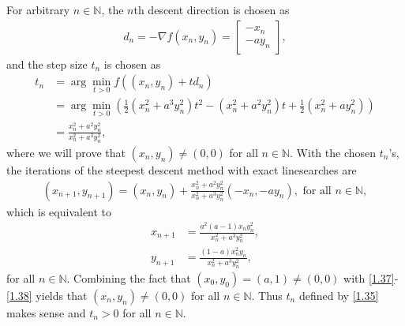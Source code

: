 \documentclass[a4paper]{article}
\numberwithin{equation}{section}
\begin{document}
For arbitrary $n\in \mathbb{N}$, the $n$th descent direction is chosen as
\begin{align}
{d_n} =  - \nabla f\left( {{x_n},{y_n}} \right) = \left[ {\begin{array}{*{20}{c}}
{ - {x_n}}\\
{ - a{y_n}}
\end{array}} \right],
\end{align}
and the step size $t_n$ is chosen as
\begin{align}
{t_n}  &= \arg \mathop {\min }\limits_{t > 0} f\left( {\left( {{x_n},{y_n}} \right) + t{d_n}} \right)\\
 &= \arg \mathop {\min }\limits_{t > 0} \left( {\frac{1}{2}\left( {x_n^2 + {a^3}y_n^2} \right){t^2} - \left( {x_n^2 + {a^2}y_n^2} \right)t + \frac{1}{2}\left( {x_n^2 + ay_n^2} \right)} \right)\\
 &= \frac{{x_n^2 + {a^2}y_n^2}}{{x_n^2 + {a^3}y_n^2}}, \label{1.35}
\end{align}
where we will prove that $\left(x_n,y_n\right)\ne \left(0,0\right)$ for all $n\in \mathbb{N}$. With the chosen $t_n$'s, the iterations of the steepest descent method with exact linesearches are
\begin{align}
\left( {{x_{n + 1}},{y_{n + 1}}} \right) = \left( {{x_n},{y_n}} \right) + \frac{{x_n^2 + {a^2}y_n^2}}{{x_n^2 + {a^3}y_n^2}}\left( { - {x_n}, - a{y_n}} \right),\mbox{ for all } n \in \mathbb{N},
\end{align}
which is equivalent to
\begin{align}
\label{1.37}
{x_{n + 1}} &= \frac{{{a^2}\left( {a - 1} \right){x_n}y_n^2}}{{x_n^2 + {a^3}y_n^2}},\\
{y_{n + 1}} &= \frac{{\left( {1 - a} \right)x_n^2{y_n}}}{{x_n^2 + {a^3}y_n^2}}, \label{1.38}
\end{align}
for all $n\in \mathbb{N}$. Combining the fact that $\left(x_0,y_0\right)=\left(a,1\right) \ne \left(0,0\right)$ with \eqref{1.37}-\eqref{1.38} yields that $\left(x_n,y_n\right)\ne \left(0,0\right)$ for all $n\in \mathbb{N}$. Thus $t_n$ defined by \eqref{1.35} makes sense and $t_n>0$ for all $n\in \mathbb{N}$.  
\end{document}

